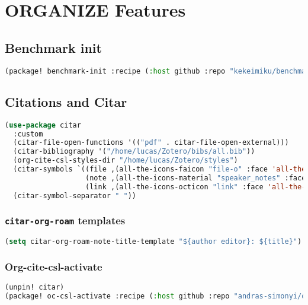 \documentclass[11pt]{article}
\begin{document}
\section{ORGANIZE Features}
\label{sec:organize-features}


\subsection{Benchmark init}
\label{sec:benchmark-init}
\begin{lstlisting}[language=Lisp]
(package! benchmark-init :recipe (:host github :repo "kekeimiku/benchmark-init-el"))
\end{lstlisting}

\subsection{Citations and Citar}
\label{sec:citations-and-citar}
\begin{lstlisting}[language=Lisp]
(use-package citar
  :custom
  (citar-file-open-functions '(("pdf" . citar-file-open-external)))
  (citar-bibliography '("/home/lucas/Zotero/bibs/all.bib"))
  (org-cite-csl-styles-dir "/home/lucas/Zotero/styles")
  (citar-symbols `((file ,(all-the-icons-faicon "file-o" :face 'all-the-icons-green :v-adjust -0.1) . " ")
                   (note ,(all-the-icons-material "speaker_notes" :face 'all-the-icons-blue :v-adjust -0.3) . " ")
                   (link ,(all-the-icons-octicon "link" :face 'all-the-icons-orange :v-adjust 0.01) . " ")))
  (citar-symbol-separator " "))
\end{lstlisting}

\subsubsection{\texttt{citar-org-roam} templates}
\label{sec:citar-org-roam-templates}
\begin{lstlisting}[language=Lisp]
(setq citar-org-roam-note-title-template "${author editor}: ${title}")
\end{lstlisting}

\subsubsection{Org-cite-csl-activate}
\label{sec:org-cite-csl-activate}
\begin{lstlisting}[language=Lisp]
(unpin! citar) 
(package! oc-csl-activate :recipe (:host github :repo "andras-simonyi/org-cite-csl-activate"))
\end{lstlisting}
\end{document}
